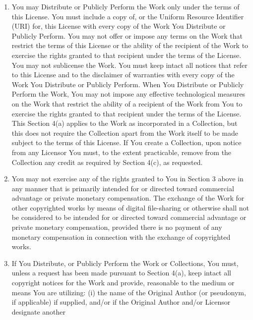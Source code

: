 \begin{enumerate}
 \item You may Distribute or Publicly Perform the Work only under the
       terms of this License. You must include a copy of, or the Uniform
       Resource Identifier (URI) for, this License  with every copy of
       the Work You Distribute or Publicly Perform. You may not offer or
       impose any terms on the Work that restrict the terms of this
       License or the ability of the recipient of the Work to exercise
       the rights granted to that recipient under the terms of the
       License. You may not sublicense the Work. You must keep intact
       all notices that refer to this License and to the disclaimer of
       warranties with every copy of the Work You Distribute or Publicly
       Perform. When You Distribute or Publicly Perform the Work, You
       may not impose any effective technological measures on the Work
       that restrict the ability of a recipient of the Work from You to
       exercise the rights granted to that recipient under the terms of
       the License. This Section 4(a) applies to the Work as
       incorporated in a Collection, but this does not require the
       Collection apart from the Work itself to be made subject to the
       terms of this License. If You create a Collection, upon notice
       from any Licensor You must, to the extent practicable, remove
       from the Collection any credit as required by Section 4(c), as
       requested.
 \item You may not exercise any of the rights granted to You in Section
       3 above in any manner that is primarily intended for or directed
       toward commercial advantage or private monetary compensation. The
       exchange of the Work for other copyrighted works by means of
       digital file-sharing or otherwise shall not be considered to be
       intended for or directed toward commercial advantage or private
       monetary compensation, provided there is no payment of any
       monetary compensation in connection with the exchange of
       copyrighted works.
 \item If You Distribute, or Publicly Perform the Work or Collections,
       You must, unless a request has been made pursuant to Section
       4(a), keep intact all copyright notices for the Work and provide,
       reasonable to the medium or means You are utilizing: (i) the name
       of the Original Author (or pseudonym, if applicable) if supplied,
       and/or if the Original Author and/or Licensor designate another

\end{enumerate}
